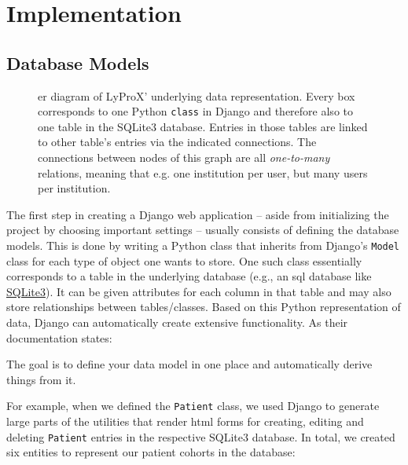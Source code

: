 \documentclass[\relativeRoot/main.tex]{subfiles}
\begin{document}
\section{Implementation}
\label{sec:lyprox:implementation}

\subsection*{Database Models}
\label{subsec:lyprox:implementation:models}

\begin{figure}
    \centering
    \def\svgwidth{1.0\textwidth}
    
    \caption[
        ER diagram of LyProX' data model
    ]{
        \Acrlong{er} diagram of LyProX' underlying data representation. Every box corresponds to one Python \texttt{class} in Django and therefore also to one table in the SQLite3 database. Entries in those tables are linked to other table's entries via the indicated connections. The connections between nodes of this graph are all \emph{one-to-many} relations, meaning that e.g. one institution per user, but many users per institution.
    }
    \label{fig:lyprox:er_diagram}
\end{figure}

The first step in creating a Django web application -- aside from initializing the project by choosing important settings -- usually consists of defining the database models. This is done by writing a Python class that inherits from Django's \texttt{Model} class for each type of object one wants to store. One such class essentially corresponds to a table in the underlying database (e.g., an \acrshort{sql} database like \href{https://www.sqlite.org/index.html}{SQLite3}). It can be given attributes for each column in that table and may also store relationships between tables/classes. Based on this Python representation of data, Django can automatically create extensive functionality. As their documentation states: 

\begin{displayquote}
    The goal is to define your data model in one place and automatically derive things from it.
\end{displayquote}

For example, when we defined the \texttt{Patient} class, we used Django to generate large parts of the utilities that render \acrshort{html} forms for creating, editing and deleting \texttt{Patient} entries in the respective SQLite3 database. In total, we created six entities to represent our patient cohorts in the database:
\end{document}
